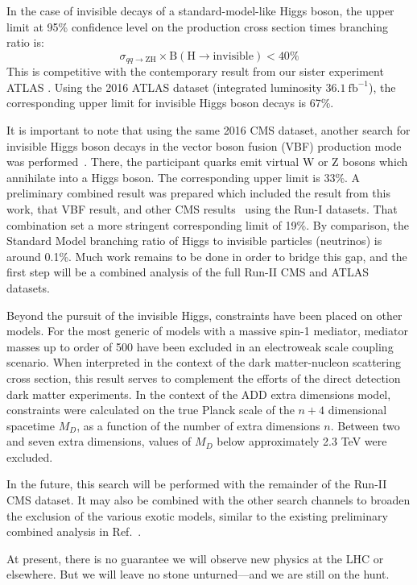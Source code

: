 In the case of invisible decays of a standard-model-like Higgs boson,
the upper limit at 95\% confidence level on the production cross section times branching ratio is:
\begin{equation*}
\sigma_{qq\rightarrow\mathrm{ZH}} \times \mathrm{B(H \rightarrow invisible)} < 40\%
\end{equation*}
This is competitive with the contemporary result from our sister experiment ATLAS \cite{Aaboud:2017bja}.
Using the 2016 ATLAS dataset (integrated luminosity $36.1~\mathrm{fb}^{-1}$), 
the corresponding upper limit for invisible Higgs boson decays is 67\%.

It is important to note that using the same 2016 CMS dataset,
another search for invisible Higgs boson decays in the vector boson fusion (VBF) production mode was performed~\cite{Sirunyan:2018owy}.
There, the participant quarks emit virtual W or Z bosons which annihilate into a Higgs boson.
The corresponding upper limit is 33\%.
A preliminary combined result was prepared which included the result from this work, that VBF result, and other CMS results~\cite{Chatrchyan:2014tja} using the Run-I datasets.
That combination set a more stringent corresponding limit of 19\%.
By comparison, the Standard Model branching ratio of Higgs to invisible particles (neutrinos) is around 0.1\%.
Much work remains to be done in order to bridge this gap,
and the first step will be a combined analysis of the full Run-II CMS and ATLAS datasets.

Beyond the pursuit of the invisible Higgs, constraints have been placed on other models.
For the most generic of models with a massive spin-1 mediator,
mediator masses up to order of 500 \GeV have been excluded in an electroweak scale coupling scenario.
When interpreted in the context of the dark matter-nucleon scattering cross section,
this result serves to complement the efforts of the direct detection dark matter experiments.
In the context of the ADD extra dimensions model, constraints were calculated on the true Planck scale of the $n+4$ dimensional spacetime $M_D$, as a function of the number of extra dimensions $n$.
Between two and seven extra dimensions, values of $M_D$ below approximately 2.3 TeV were excluded.

In the future, this search will be performed with the remainder of the Run-II CMS dataset.
It may also be combined with the other search channels to broaden the exclusion
of the various exotic models, similar to the existing preliminary combined analysis
in Ref.~\cite{CMS-PAPER-HIG-16-016}.

At present, there is no guarantee we will observe new physics at the LHC or elsewhere.
But we will leave no stone unturned---and we are still on the hunt.
